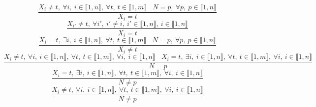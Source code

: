$$\frac{X_{i} \neq t,~\forall i,~i \in \llbracket1,n\rrbracket,~\forall t,~t \in \llbracket1,m\rrbracket~~~~N=p,~\forall p,~p \in \llbracket1,n\rrbracket}{X_{i}=t}$$ $$\frac{X_{i'} \neq t,~\forall i',~i' \neq i,~i' \in \llbracket1,n\rrbracket,~i \in \llbracket1,n\rrbracket}{X_{i}=t}$$ $$\frac{X_{i}=t,~\exists i,~i \in \llbracket1,n\rrbracket,~\forall t,~t \in \llbracket1,m\rrbracket~~~~N=p,~\forall p,~p \in \llbracket1,n\rrbracket}{X_{i} \neq t}$$ $$\frac{X_{i} \neq t,~\forall i,~i \in \llbracket1,n\rrbracket,~\forall t,~t \in \llbracket1,m\rrbracket,~\forall i,~i \in \llbracket1,n\rrbracket~~~~X_{i}=t,~\exists i,~i \in \llbracket1,n\rrbracket,~\forall t,~t \in \llbracket1,m\rrbracket,~\forall i,~i \in \llbracket1,n\rrbracket}{N=p}$$ $$\frac{X_{i}=t,~\exists i,~i \in \llbracket1,n\rrbracket,~\forall t,~t \in \llbracket1,m\rrbracket,~\forall i,~i \in \llbracket1,n\rrbracket}{N \neq p}$$ $$\frac{X_{i} \neq t,~\forall i,~i \in \llbracket1,n\rrbracket,~\forall t,~t \in \llbracket1,m\rrbracket,~\forall i,~i \in \llbracket1,n\rrbracket}{N \neq p}$$ 